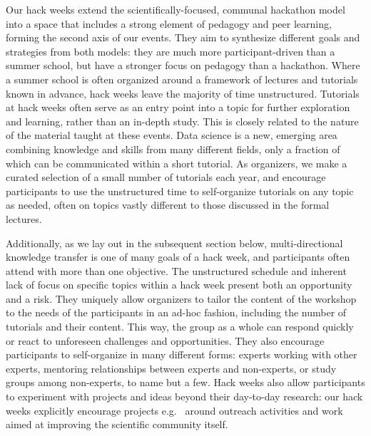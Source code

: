 Our hack weeks extend the scientifically-focused, communal hackathon model into a space that includes a strong element of pedagogy and peer learning, forming the second axis of our events. They aim to synthesize different goals and strategies from both models: they are much more participant-driven than a summer school, but have a stronger focus on pedagogy than a hackathon. Where a summer school is often organized around a framework of lectures and tutorials known in advance, hack weeks leave the majority of time unstructured. Tutorials at hack weeks often serve as an entry point into a topic for further exploration and learning, rather than an in-depth study. This is closely related to the nature of the material taught at these events. Data science is a new, emerging area combining knowledge and skills from many different fields, only a fraction of which can be communicated within a short tutorial. As organizers, we make a curated selection of a small number of tutorials each year, and encourage participants to use the unstructured time to self-organize tutorials on any topic as needed, often on topics vastly different to those discussed in the formal lectures. 

Additionally, as we lay out in the subsequent section below, multi-directional knowledge transfer is one of many goals of a hack week, and participants often attend with more than one objective. The unstructured schedule and inherent lack of focus on specific topics within a hack week present both an opportunity and a risk. They uniquely allow organizers to tailor the content of the workshop to the needs of the participants in an ad-hoc fashion, including the number of tutorials and their content. This way, the group as a whole can respond quickly or react to unforeseen challenges and opportunities. They also encourage participants to self-organize in many different forms: experts working with other experts, mentoring relationships between experts and non-experts, or study groups among non-experts, to name but a few. Hack weeks also allow participants to experiment with projects and ideas beyond their day-to-day research: our hack weeks explicitly encourage projects e.g.~ around outreach activities and work aimed at improving the scientific community itself. 

